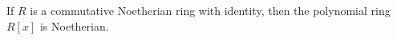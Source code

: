 If $R$ is a commutative Noetherian ring with identity, then the polynomial ring $R[x]$ is Noetherian.
